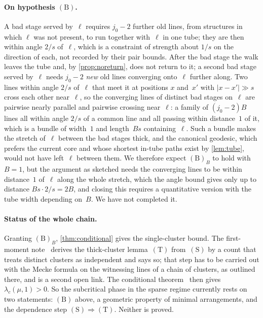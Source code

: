 \documentclass[11pt,letterpaper]{article}
\begin{document}
\paragraph{On hypothesis $\mathrm{(B)}$.} A bad stage served by~$\ell$ requires $j_0-2$ further old lines, from structures in which $\ell$ was not present, to run together with~$\ell$ in one tube; they are then within angle $2/s$ of~$\ell$, which is a constraint of strength about $1/s$ on the direction of each, not recorded by their pair bounds. After the bad stage the walk leaves the tube and, by \cref{prop:noreturn}, does not return to it; a second bad stage served by~$\ell$ needs $j_0-2$ \emph{new} old lines converging onto~$\ell$ further along. Two lines within angle $2/s$ of~$\ell$ that meet it at positions $x$ and~$x'$ with $\lvert x-x'\rvert\gg s$ cross each other near~$\ell$, so the converging lines of distinct bad stages on~$\ell$ are pairwise nearly parallel and pairwise crossing near~$\ell$: a family of $(j_0-2)B$ lines all within angle $2/s$ of a common line and all passing within distance~$1$ of it, which is a bundle of width~$1$ and length~$Bs$ containing~$\ell$. Such a bundle makes the stretch of~$\ell$ between the bad stages thick, and the canonical geodesic, which prefers the current core and whose shortest in-tube paths exist by \cref{lem:tube}, would not have left~$\ell$ between them. We therefore expect $\mathrm{(B)}_B$ to hold with $B=1$, but the argument as sketched needs the converging lines to be within distance~$1$ of~$\ell$ along the whole stretch, which the angle bound gives only up to distance $Bs\cdot2/s=2B$, and closing this requires a quantitative version with the tube width depending on~$B$. We have not completed it.

\paragraph{Status of the whole chain.} Granting $\mathrm{(B)}_B$, \cref{thm:conditional} gives the single-cluster bound. The first-moment note~\cite[Section~3.1]{FM26} derives the thick-cluster lemma~$\mathrm{(T)}$ from~$\mathrm{(S)}$ by a count that treats distinct clusters as independent and says so; that step has to be carried out with the Mecke formula on the witnessing lines of a chain of clusters, as outlined there, and is a second open link. The conditional theorem~\cite[Theorem~1.2]{FM26} then gives $\lambda_c(\mu,1)>0$. So the subcritical phase in the sparse regime currently rests on two statements: $\mathrm{(B)}$ above, a geometric property of minimal arrangements, and the dependence step $\mathrm{(S)}\Rightarrow\mathrm{(T)}$. Neither is proved.
\end{document}
